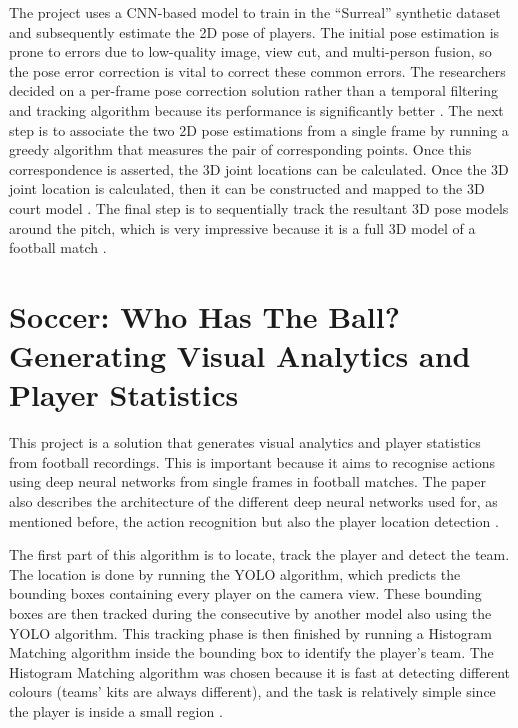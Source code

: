 \documentclass[
    11pt,
    oneside
]{report}
\begin{document}
The project uses a CNN-based model to train in the ``Surreal'' synthetic dataset \cite{surreal} and subsequently estimate the 2D pose of players.
The initial pose estimation is prone to errors due to low-quality image, view cut, and multi-person fusion, so the pose error correction is vital to correct these common errors. The researchers decided on a per-frame pose correction solution rather than a temporal filtering and tracking algorithm because its performance is significantly better \cite{cvpr_2019}.
The next step is to associate the two 2D pose estimations from a single frame by running a greedy algorithm that measures the pair of corresponding points. Once this correspondence is asserted, the 3D joint locations can be calculated. Once the 3D joint location is calculated, then it can be constructed and mapped to the 3D court model \cite{cvpr_2019}.
The final step is to sequentially track the resultant 3D pose models around the pitch, which is very impressive because it is a full 3D model of a football match \cite{cvpr_2019}.






\section{Soccer: Who Has The Ball? Generating Visual Analytics and Player Statistics}


This project is a solution that generates visual analytics and player statistics from football recordings. This is important because it aims to recognise actions using deep neural networks from single frames in football matches. The paper also describes the architecture of the different deep neural networks used for, as mentioned before, the action recognition but also the player location detection \cite{cvpr_2018}.




The first part of this algorithm is to locate, track the player and detect the team. The location is done by running the YOLO \cite{yolo} algorithm, which predicts the bounding boxes containing every player on the camera view. These bounding boxes are then tracked during the consecutive by another model also using the YOLO \cite{yolo} algorithm. This tracking phase is then finished by running a Histogram Matching algorithm inside the bounding box to identify the player's team. The Histogram Matching algorithm was chosen because it is fast at detecting different colours (teams' kits are always different), and the task is relatively simple since the player is inside a small region \cite{cvpr_2018}.
\end{document}
